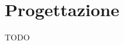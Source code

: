 \documentclass{llncs}
\newcommand{\labelsec}[1]{\label{sec:#1}}
\newcommand{\labelssec}[1]{\label{ssec:#1}}
\begin{document}





\section{Progettazione}\labelsec{project}
TODO %


\end{document}
